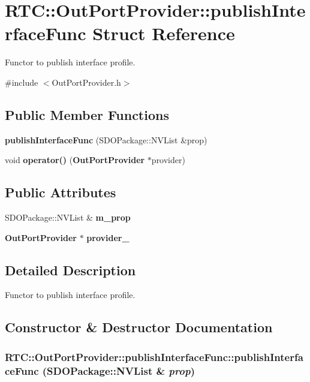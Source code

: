 \section{RTC::OutPortProvider::publishInterfaceFunc Struct Reference}
\label{structRTC_1_1OutPortProvider_1_1publishInterfaceFunc}


Functor to publish interface profile.  




{\ttfamily \#include $<$OutPortProvider.h$>$}

\subsection*{Public Member Functions}
\begin{DoxyCompactItemize}
\item 
{\bf publishInterfaceFunc} (SDOPackage::NVList \&prop)
\item 
void {\bf operator()} ({\bf OutPortProvider} $\ast$provider)
\end{DoxyCompactItemize}
\subsection*{Public Attributes}
\begin{DoxyCompactItemize}
\item 
SDOPackage::NVList \& {\bf m\_\-prop}
\item 
{\bf OutPortProvider} $\ast$ {\bf provider\_\-}
\end{DoxyCompactItemize}


\subsection{Detailed Description}
Functor to publish interface profile. 

\subsection{Constructor \& Destructor Documentation}
\subsubsection[{publishInterfaceFunc}]{\setlength{\rightskip}{0pt plus 5cm}RTC::OutPortProvider::publishInterfaceFunc::publishInterfaceFunc (SDOPackage::NVList \& {\em prop})\hspace{0.3cm}{\ttfamily  [inline]}}\label{structRTC_1_1OutPortProvider_1_1publishInterfaceFunc_ac1b26c6a01459c3be80e403c93857f92}


